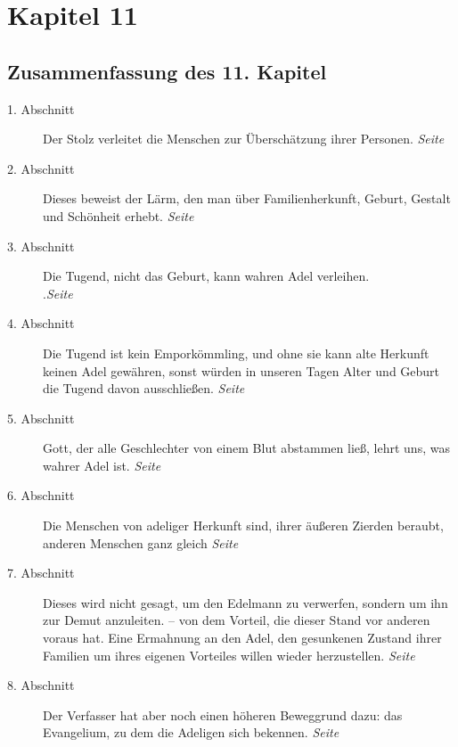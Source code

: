 
\chapter{Kapitel 11} \label{kap11}
\section{Zusammenfassung des 11. Kapitel}

\begin{description}
\item[1. Abschnitt] Der Stolz verleitet die Menschen zur Überschätzung ihrer
Personen.
\dotfill \textit{Seite~\pageref{kap11_ab1}}\\
\item[2. Abschnitt] Dieses beweist der Lärm, den man über Familienherkunft,
Geburt, Gestalt und Schönheit erhebt.
\dotfill \textit{Seite~\pageref{kap11_ab2}}\\
\item[3. Abschnitt] Die Tugend, nicht das Geburt, kann wahren Adel verleihen.\\
.\dotfill \textit{Seite~\pageref{kap11_ab3}}\\
\item[4. Abschnitt] Die Tugend ist kein Emporkömmling, und ohne sie kann alte
Herkunft keinen Adel gewähren, sonst würden in unseren Tagen Alter und Geburt
die
Tugend davon ausschließen.
\dotfill \textit{Seite~\pageref{kap11_ab4}}\\
\item[5. Abschnitt] Gott, der alle Geschlechter von einem Blut abstammen ließ,
lehrt uns, was wahrer Adel ist.
\dotfill \textit{Seite~\pageref{kap11_ab5}}\\
\item[6. Abschnitt] Die Menschen von adeliger Herkunft sind, ihrer äußeren
Zierden
beraubt, anderen Menschen ganz gleich
\dotfill \textit{Seite~\pageref{kap11_ab6}}\\
\item[7. Abschnitt] Dieses wird nicht gesagt, um den Edelmann zu verwerfen,
sondern um ihn zur Demut anzuleiten. -- von dem Vorteil, die dieser Stand vor
anderen voraus hat. Eine Ermahnung an den Adel, den gesunkenen Zustand ihrer
Familien um ihres eigenen Vorteiles willen wieder herzustellen.
\dotfill \textit{Seite~\pageref{kap11_ab7}}\\
\item[8. Abschnitt] Der Verfasser hat aber noch einen höheren Beweggrund dazu:
das Evangelium, zu dem die Adeligen sich bekennen.
\dotfill \textit{Seite~\pageref{kap11_ab8}}\\

\end{description}
